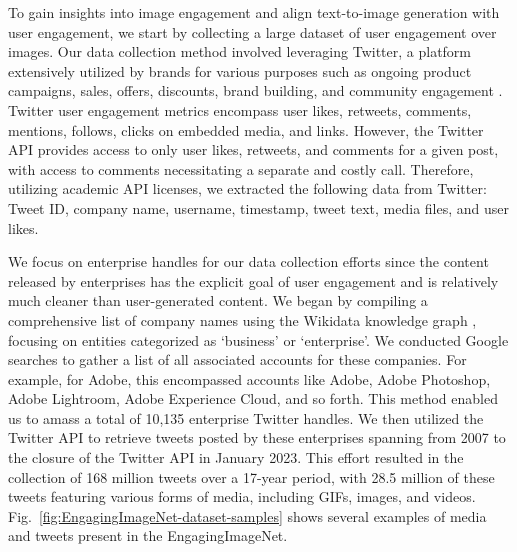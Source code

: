  To gain insights into image engagement and align text-to-image generation with user engagement, we start by collecting a large dataset of user engagement over images. Our data collection method involved leveraging Twitter, a platform extensively utilized by brands for various purposes such as ongoing product campaigns, sales, offers, discounts, brand building, and community engagement \cite{alalwan2017social}. Twitter user engagement metrics encompass user likes, retweets, comments, mentions, follows, clicks on embedded media, and links. However, the Twitter API provides access to only user likes, retweets, and comments for a given post, with access to comments necessitating a separate and costly call. Therefore, utilizing academic API licenses, we extracted the following data from Twitter: Tweet ID, company name, username, timestamp, tweet text, media files, and user likes. %
 
 
 We focus on enterprise handles for our data collection efforts since the content released by enterprises has the explicit goal of user engagement and is relatively much cleaner than user-generated content. We began by compiling a comprehensive list of company names using the Wikidata knowledge graph \cite{wikidata}, focusing on entities categorized as `business' or `enterprise'. We conducted Google searches to gather a list of all associated accounts for these companies. For example, for Adobe, this encompassed accounts like Adobe, Adobe Photoshop, Adobe Lightroom, Adobe Experience Cloud, and so forth. This method enabled us to amass a total of 10,135 enterprise Twitter handles. We then utilized the Twitter API to retrieve tweets posted by these enterprises spanning from 2007 to the closure of the Twitter API in January 2023. This effort resulted in the collection of 168 million tweets over a 17-year period, with 28.5 million of these tweets featuring various forms of media, including GIFs, images, and videos. Fig.~\ref{fig:EngagingImageNet-dataset-samples} shows several examples of media and tweets present in the EngagingImageNet. %
 

